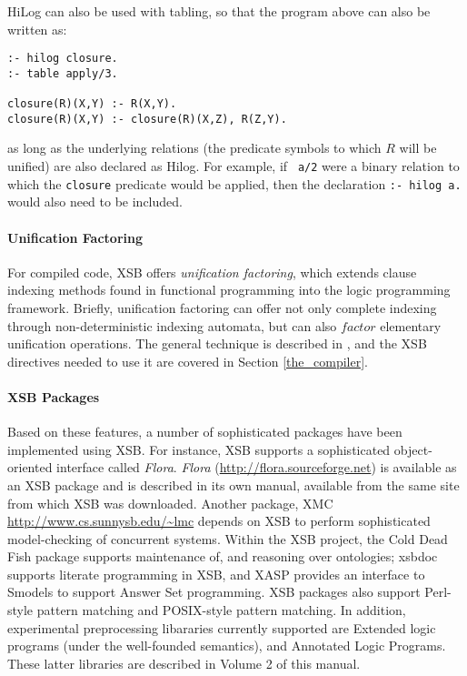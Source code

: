 HiLog can also be used with tabling, so that the program above can also be
written as:
\begin{center}
\begin{minipage}{3.7in}
\begin{verbatim}
:- hilog closure.
:- table apply/3.

closure(R)(X,Y) :- R(X,Y).
closure(R)(X,Y) :- closure(R)(X,Z), R(Z,Y).
\end{verbatim}
\end{minipage}
\end{center}
as long as the underlying relations (the predicate symbols to which
$R$ will be unified) are also declared as Hilog.  For example, if {\tt
a/2} were a binary relation to which the {\tt closure} predicate would
be applied, then the declaration {\tt :- hilog a.} would also need to
be included.

\paragraph{Unification Factoring} For compiled code, XSB offers {\em
  unification factoring}, which extends clause indexing methods found
in functional programming into the logic programming framework.
Briefly, unification factoring can offer not only complete indexing
through non-deterministic indexing automata, but can also $factor$
elementary unification operations.  The general technique is described
in \cite{DRSS96}, and the XSB directives needed to use it are covered
in Section \ref{the_compiler}.

  
\paragraph{XSB Packages} Based on these features, a number of
sophisticated packages have been implemented using XSB.  For instance,
XSB supports a sophisticated object-oriented interface called {\em
  Flora}.  {\em Flora} (\url{http://flora.sourceforge.net}) is
available as an XSB package and is described in its own manual,
available from the same site from which XSB was downloaded.  Another
package, XMC \url{http://www.cs.sunnysb.edu/~lmc} depends on XSB to
perform sophisticated model-checking of concurrent systems.  Within
the XSB project, the Cold Dead Fish package supports maintenance of,
and reasoning over ontologies; xsbdoc supports literate programming in
XSB, and XASP provides an interface to Smodels to support Answer Set
programming.  XSB packages also support Perl-style pattern matching
and POSIX-style pattern matching.  In addition, experimental
preprocessing libararies currently supported are Extended logic
programs (under the well-founded semantics), and Annotated Logic
Programs.  These latter libraries are described in Volume 2 of this
manual.

